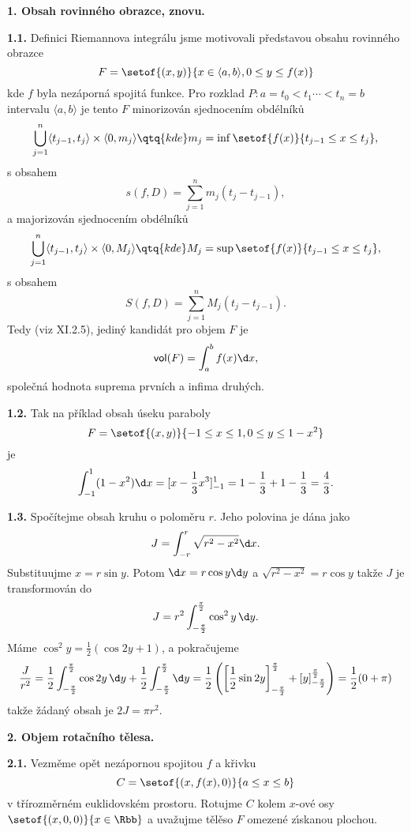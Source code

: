 \documentclass[12pt]{article}
\begin{document}
{ \vskip10mm
 
 
 
 {\large\bf 1. Obsah rovinného obrazce, znovu.}
 
 \def\vol{\text{\sf vol}}
 
 \bigskip
 
 {\bf 1.1.} Definici Riemannova integrálu jsme motivovali představou obsahu rovinného obrazce 
 $$
 F=\setof{(x,y)}{x\in \langle a,b\rangle , 0\leq y\leq f(x)}
 $$
 kde $f$ byla nezáporná spojitá funkce. Pro rozklad $P:a=t_0<t_1\cdots<t_n=b$ intervalu $\langle a,b\rangle$ je tento $F$ minorizován sjednocením obdélníků
 $$
 \bigcup_{j=1}^n\langle t_{j-1},t_j\rangle\times\langle 0,m_j\rangle
 \qtq{kde} m_j=\inf\setof{f(x)}{t_{j-1}\leq x\leq t_j},
 $$
 s obsahem
 $$
 s(f,D)=\sum_{j=1}^n m_j(t_j-t_{j-1}),
 $$
 a majorizován sjednocením obdélníků
 $$
 \bigcup_{j=1}^n\langle t_{j-1},t_j\rangle\times\langle 0,M_j\rangle
 \qtq{kde} M_j=\sup\setof{f(x)}{t_{j-1}\leq x\leq t_j},
 $$
 s obsahem
 $$
 S(f,D)=\sum_{j=1}^n M_j(t_j-t_{j-1}).
 $$ 
Tedy (viz XI.2.5), jediný kandidát pro objem $ F$ je
 $$ 
 \vol(F)=\int_a^bf(x)\d x,
$$
společná hodnota suprema prvních a infima druhých.

\bigskip

{\bf 1.2.} Tak na příklad obsah úseku paraboly
$$
F= \setof{(x,y)}{-1\leq x\leq 1,0\leq y\leq 1-x^2}
$$
je
$$
\int_{-1}^1(1- x^2)\d x=[x-\frac13 x^3]_{-1}^1=1-\frac13+1-\frac13=\frac43.
$$

\bigskip

{\bf 1.3.} Spočítejme obsah kruhu o poloměru $r$. Jeho polovina je dána jako
$$
J=\int_{-r}^r\sqrt{r^2-x^2}\d x.
$$
Substituujme $x=r\sin y$. Potom $\d x=r\cos y\d y$ a $\sqrt{r^2-x^2}=r\cos y$
takže $J$ je transformován do
$$
J=r^2\int_{-\frac{\pi}2}^{\frac{\pi}2}\cos^2y\,\d y.
$$
Máme $\cos^2y=\frac12(\cos 2y+1)$, a pokračujeme
$$
\frac{J}{r^2}=\frac12 \int_{-\frac{\pi}2}^{\frac{\pi}2}\cos 2y\,\d y+
\frac12\int_{-\frac{\pi}2}^{\frac{\pi}2}\d y=
\frac12\left(\left[\frac12\sin 2y\right]_{-\frac{\pi}2}^{\frac{\pi}2}+
[y]_{-\frac{\pi}2}^{\frac{\pi}2}\right)=\frac12(0+\pi)
$$
takže žádaný obsah je $2J=\pi r^2$.



\vskip10mm
 
 {\large\bf 2. Objem rotačního tělesa.} 
 
 \bigskip
 
 {\bf 2.1.} Vezměme opět nezápornou spojitou $f$ a křivku
 $$
 C=\setof{(x,f(x),0)}{a\leq x\leq b}
 $$
 v třírozměrném euklidovském prostoru. Rotujme $C$ kolem $x$-ové osy
 $\setof{(x,0,0)}{x\in \Rbb}$ a uvažujme tělěso $F$ omezené z\'\i skanou plochou.
 
}
\end{document}
